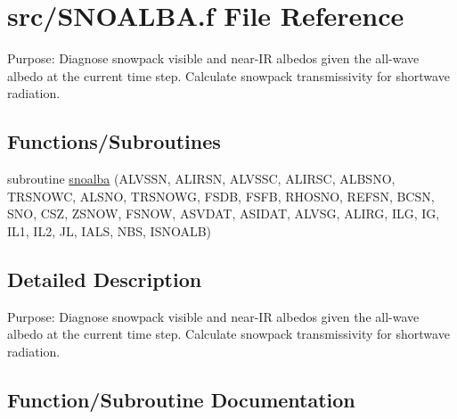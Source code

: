 \hypertarget{SNOALBA_8f}{}\section{src/\+S\+N\+O\+A\+L\+B\+A.f File Reference}
\label{SNOALBA_8f}


Purpose\+: Diagnose snowpack visible and near-\/\+I\+R albedos given the all-\/wave albedo at the current time step. Calculate snowpack transmissivity for shortwave radiation.  


\subsection*{Functions/\+Subroutines}
\begin{DoxyCompactItemize}
\item 
subroutine \hyperlink{SNOALBA_8f_a414a4eaf6a7d196c40633aa1c1ab2159}{snoalba} (A\+L\+V\+S\+S\+N, A\+L\+I\+R\+S\+N, A\+L\+V\+S\+S\+C, A\+L\+I\+R\+S\+C, A\+L\+B\+S\+N\+O, T\+R\+S\+N\+O\+W\+C, A\+L\+S\+N\+O, T\+R\+S\+N\+O\+W\+G, F\+S\+D\+B, F\+S\+F\+B, R\+H\+O\+S\+N\+O, R\+E\+F\+S\+N, B\+C\+S\+N, S\+N\+O, C\+S\+Z, Z\+S\+N\+O\+W, F\+S\+N\+O\+W, A\+S\+V\+D\+A\+T, A\+S\+I\+D\+A\+T, A\+L\+V\+S\+G, A\+L\+I\+R\+G, I\+L\+G, I\+G, I\+L1, I\+L2, J\+L, I\+A\+L\+S, N\+B\+S, I\+S\+N\+O\+A\+L\+B)
\end{DoxyCompactItemize}


\subsection{Detailed Description}
Purpose\+: Diagnose snowpack visible and near-\/\+I\+R albedos given the all-\/wave albedo at the current time step. Calculate snowpack transmissivity for shortwave radiation. 



\subsection{Function/\+Subroutine Documentation}
\hypertarget{SNOALBA_8f_a414a4eaf6a7d196c40633aa1c1ab2159}{}
